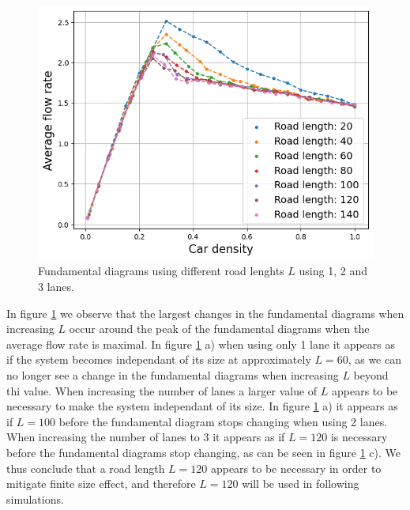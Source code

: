 \documentclass[a4paper,12pt]{article}
\begin{document}
\begin{figure}[H]
\begin{minipage}{.5\textwidth}
        \includegraphics[scale=0.47]{Images/fundamental diagrams 3 lanes 140.png}
    \end{minipage}%
    \caption{Fundamental diagrams using different road lenghts $L$ using 1, 2 and 3 lanes.}
    \label{finite size effects}
\end{figure}

In figure \ref*{finite size effects} we observe that the largest changes in the fundamental diagrams when increasing $L$ occur around the
peak of the fundamental diagrams when the average flow rate is maximal. In figure \ref*{finite size effects} a) when using only 1 lane it appears
as if the system becomes independant of its size at approximately $L=60$, as we can no longer see a change in the fundamental diagrams when increasing
$L$ beyond thi value. When increasing the number of lanes a larger value of $L$ appears to be necessary to make the system independant of its size. 
In figure \ref*{finite size effects} a) it appears as if $L=100$ before the fundamental diagram stops changing when using 2 lanes. When increasing the number
of lanes to 3 it appears as if $L=120$ is necessary before the fundamental diagrams stop changing, as can be seen in figure \ref*{finite size effects} c).
We thus conclude that a road length $L=120$ appears to be necessary in order to mitigate finite size effect, and therefore $L=120$ will be used
in following simulations.
\end{document}
